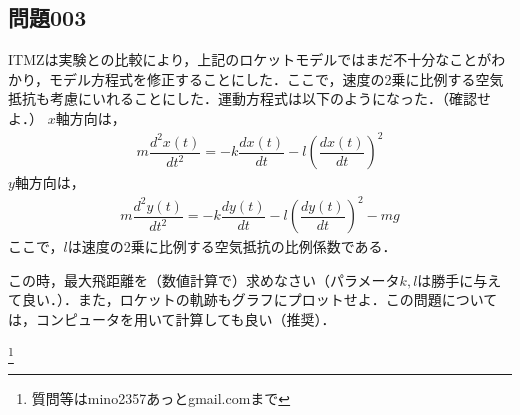 \documentclass[12pt]{jarticle}
\begin{document}
\subsection*{問題003}
ITMZは実験との比較により，上記のロケットモデルではまだ不十分なことがわかり，モデル方程式を修正することにした．ここで，速度の2乗に比例する空気抵抗も考慮にいれることにした．運動方程式は以下のようになった．（確認せよ．）
$x$軸方向は，
\begin{align*}
m \dfrac{d^2 x(t)}{dt^2} = - k \dfrac{dx(t)}{dt} - l \left( \dfrac{dx(t)}{dt} \right)^2 
\end{align*}
$y$軸方向は，
\begin{align*}
m \dfrac{d^2 y(t)}{dt^2} = - k \dfrac{dy(t)}{dt} - l \left( \dfrac{dy(t)}{dt} \right)^2  - mg
\end{align*}
ここで，$l$は速度の2乗に比例する空気抵抗の比例係数である．

この時，最大飛距離を（数値計算で）求めなさい（パラメータ$k, l$は勝手に与えて良い．）．また，ロケットの軌跡もグラフにプロットせよ．この問題については，コンピュータを用いて計算しても良い（推奨）．


\footnote[0]{
質問等はmino2357あっとgmail.comまで
}

\thispagestyle{empty}
\end{document}
